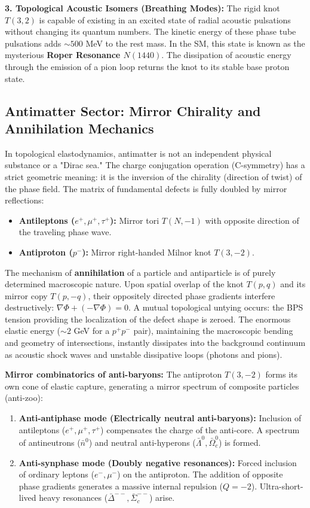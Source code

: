 \documentclass[11pt,a4paper]{article}
\begin{document}
	\textbf{3. Topological Acoustic Isomers (Breathing Modes):}
	The rigid knot $T(3,2)$ is capable of existing in an excited state of radial acoustic pulsations without changing its quantum numbers. The kinetic energy of these phase tube pulsations adds $\sim 500$ MeV to the rest mass. In the SM, this state is known as the mysterious \textbf{Roper Resonance $N(1440)$}. The dissipation of acoustic energy through the emission of a pion loop returns the knot to its stable base proton state.
	
\subsection{Antimatter Sector: Mirror Chirality and Annihilation Mechanics}
	In topological elastodynamics, antimatter is not an independent physical substance or a "Dirac sea." The charge conjugation operation (C-symmetry) has a strict geometric meaning: it is the inversion of the chirality (direction of twist) of the phase field. The matrix of fundamental defects is fully doubled by mirror reflections:
	\begin{itemize}
		\item \textbf{Antileptons ($e^+, \mu^+, \tau^+$):} Mirror tori $T(N, -1)$ with opposite direction of the traveling phase wave.
		\item \textbf{Antiproton ($p^-$):} Mirror right-handed Milnor knot $T(3, -2)$.
	\end{itemize}
	
	The mechanism of \textbf{annihilation} of a particle and antiparticle is of purely determined macroscopic nature. Upon spatial overlap of the knot $T(p,q)$ and its mirror copy $T(p,-q)$, their oppositely directed phase gradients interfere destructively: $\nabla \Phi + (-\nabla \Phi) = 0$. A mutual topological untying occurs: the BPS tension providing the localization of the defect shape is zeroed. The enormous elastic energy ($\sim 2$ GeV for a $p^+p^-$ pair), maintaining the macroscopic bending and geometry of intersections, instantly dissipates into the background continuum as acoustic shock waves and unstable dissipative loops (photons and pions).
	
	\textbf{Mirror combinatorics of anti-baryons:}
	The antiproton $T(3,-2)$ forms its own cone of elastic capture, generating a mirror spectrum of composite particles (anti-zoo):
	\begin{enumerate}
		\item \textbf{Anti-antiphase mode (Electrically neutral anti-baryons):} Inclusion of antileptons ($e^+, \mu^+, \tau^+$) compensates the charge of the anti-core. A spectrum of antineutrons ($\bar{n}^0$) and neutral anti-hyperons ($\bar{\Lambda}^0, \bar{\Omega}_c^0$) is formed.
		\item \textbf{Anti-synphase mode (Doubly negative resonances):} Forced inclusion of ordinary leptons ($e^-, \mu^-$) on the antiproton. The addition of opposite phase gradients generates a massive internal repulsion ($Q=-2$). Ultra-short-lived heavy resonances ($\bar{\Delta}^{--}, \bar{\Sigma}_c^{--}$) arise.
	\end{enumerate}
	
\end{document}
